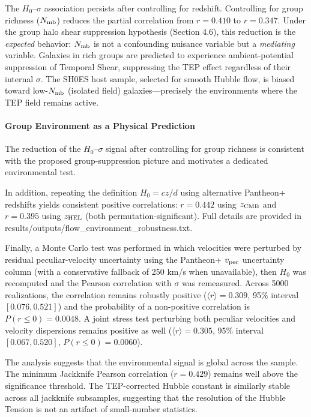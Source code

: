 \documentclass[
]{article}
\begin{document}
The \(H_0\)--\(\sigma\) association persists after controlling for
redshift. Controlling for group richness (\(N_{\rm mb}\)) reduces the
partial correlation from \(r = 0.410\) to \(r = 0.347\). Under the group
halo shear suppression hypothesis (Section 4.6), this reduction is the
\emph{expected} behavior: \(N_{\rm mb}\) is not a confounding nuisance
variable but a \emph{mediating} variable. Galaxies in rich groups are
predicted to experience ambient-potential suppression of Temporal Shear,
suppressing the TEP effect regardless of their internal \(\sigma\). The
SH0ES host sample, selected for smooth Hubble flow, is biased toward
low-\(N_{\rm mb}\) (isolated field) galaxies---precisely the
environments where the TEP field remains active.

\begin{quote}
\end{quote}

\paragraph{Group Environment as a Physical
Prediction}\label{group-environment-as-a-physical-prediction}

The reduction of the \(H_0\)--\(\sigma\) signal after controlling for
group richness is consistent with the proposed group-suppression picture
and motivates a dedicated environmental test.

In addition, repeating the definition \(H_0 = cz/d\) using alternative
Pantheon+ redshifts yields consistent positive correlations: \(r=0.442\)
using \(z_{\rm CMB}\) and \(r=0.395\) using \(z_{\rm HEL}\) (both
permutation-significant). Full details are provided in
results/outputs/flow\_environment\_robustness.txt.

Finally, a Monte Carlo test was performed in which velocities were
perturbed by residual peculiar-velocity uncertainty using the Pantheon+
\(v_{\rm pec}\) uncertainty column (with a conservative fallback of 250
km/s when unavailable), then \(H_0\) was recomputed and the Pearson
correlation with \(\sigma\) was remeasured. Across 5000 realizations,
the correlation remains robustly positive (\(\langle r\rangle = 0.309\),
95\% interval \([0.076,
0.521]\)) and the probability of a non-positive correlation is \(P(r\le
0)=0.0048\). A joint stress test perturbing both peculiar velocities and
velocity dispersions remains positive as well
(\(\langle r\rangle = 0.305\), 95\% interval \([0.067,0.520]\),
\(P(r\le0)=0.0060\)).

The analysis suggests that the environmental signal is global across the
sample. The minimum Jackknife Pearson correlation (\(r = 0.429\))
remains well above the significance threshold. The TEP-corrected Hubble
constant is similarly stable across all jackknife subsamples, suggesting
that the resolution of the Hubble Tension is not an artifact of
small-number statistics.
\end{document}
